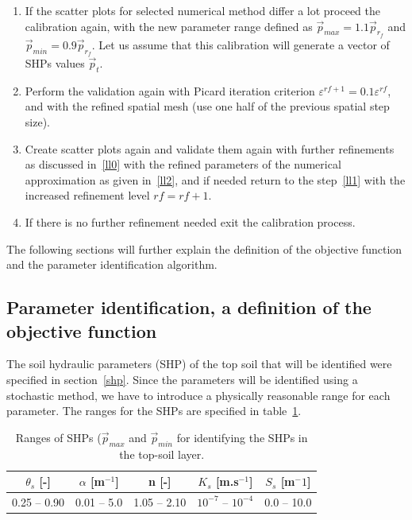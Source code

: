 \documentclass[review]{myarticle}
\begin{document}
\begin{enumerate}
  \begin{enumerate}
    \item \label{ll1} If the scatter plots for selected numerical method differ a lot proceed the calibration  again, with the new parameter range defined as $\vec{p}_{max} = 1.1\vec{p}_{r_f}$ and  $\vec{p}_{min} = 0.9\vec{p}_{r_f}$. Let us assume that this calibration will generate a vector of SHPs values $\vec{p}_{t}$.
    \item \label{ll2} Perform the validation again with Picard iteration criterion $\varepsilon^{rf+1}=0.1\varepsilon^{rf}$, and with the refined spatial mesh (use one half of the previous spatial step size).
    \item Create scatter plots again and validate them again with further refinements as discussed in~\ref{ll0} with the refined parameters of the numerical approximation as given in~\ref{ll2}, and if needed return to the step~\ref{ll1} with the increased refinement level $rf=rf+1$.
    \item If there is no further refinement needed exit the calibration process.
  \end{enumerate}
\end{enumerate}


The following sections will further explain the definition of the objective function and the parameter identification algorithm.



\subsection{Parameter identification, a definition of the objective function} %
\label{objdef}

The soil hydraulic parameters (SHP) of the top soil that will be identified were specified in section~\ref{shp}.
Since the parameters will be identified using a stochastic method, we have to introduce a physically reasonable range for each parameter. The ranges for the SHPs are specified in table~\ref{rozsahy}.

\begin{table}[ht]
\begin{center}
\caption{Ranges of SHPs ($\vec{p}_{max}$ and $\vec{p}_{min}$ for identifying the SHPs in the top-soil layer.}
\begin{small}
\doublespacing
\begin{tabular}{c c c c c}
\toprule
$\theta_s$ [-]&$\alpha$ [m$^{-1}$]&n [-]& $K_s$ [m.s$^{-1}$] & $S_s$ [m$^-1$] \\ \hline
\toprule
0.25 -- 0.90 & 0.01 -- 5.0 & 1.05 -- 2.10 & $10^{-7}$ -- $10^{-4}$ & 0.0 -- 10.0 \\
\toprule
\end{tabular}
\end{small}
\label{rozsahy}
\end{center}
\end{table}
\end{document}
